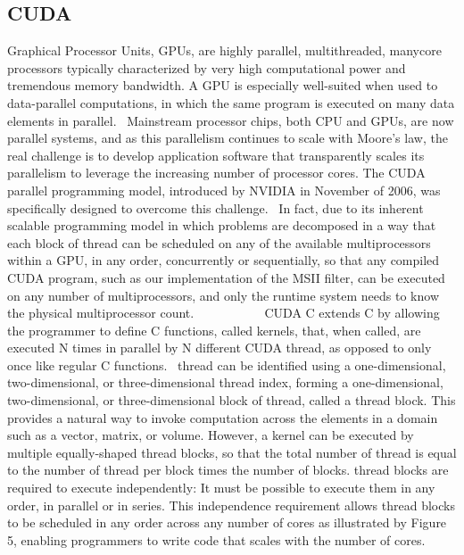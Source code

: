 \documentclass{article}
\begin{document}
\subsection{CUDA}
Graphical Processor Units, GPUs, are highly parallel, multithreaded, manycore processors typically characterized by very high computational power and tremendous memory bandwidth. A GPU is especially well-suited when used to data-parallel computations, in which the same program is executed on many data elements in parallel.~\cite[p.~1.1]{CUDA18}
Mainstream processor chips, both CPU and GPUs, are now parallel systems, and as this parallelism continues to scale with Moore's law, the real challenge is to develop application software that transparently scales its parallelism to leverage the increasing number of processor cores. The CUDA parallel programming model, introduced by NVIDIA in November of 2006, was specifically designed to overcome this challenge.~\cite[p.~1.3]{CUDA18}
In fact, due to its inherent scalable programming model in which problems are decomposed in a way that each block of thread can be scheduled on any of the available multiprocessors within a GPU, in any order, concurrently or sequentially, so that any compiled CUDA program, such as our implementation of the MSII filter, can be executed on any number of multiprocessors, and only the runtime system needs to know the physical multiprocessor count.~\cite[p.~1.3]{CUDA18}
~~~~~~~~~
CUDA C extends C by allowing the programmer to define C functions, called kernels, that, when called, are executed N times in parallel by N different CUDA thread, as opposed to only once like regular C functions.~\cite[p.~2.1]{CUDA18}
thread can be identified using a one-dimensional, two-dimensional, or three-dimensional thread index, forming a one-dimensional, two-dimensional, or three-dimensional block of thread, called a thread block. This provides a natural way to invoke computation across the elements in a domain such as a vector, matrix, or volume. However, a kernel can be executed by multiple equally-shaped thread blocks, so that the total number of thread is equal to the number of thread per block times the number of blocks. thread blocks are required to execute independently: It must be possible to execute them in any order, in parallel or in series. This independence requirement allows thread blocks to be scheduled in any order across any number of cores as illustrated by Figure 5, enabling programmers to write code that scales with the number of cores.~\cite[p.~2.2]{CUDA18}
\end{document}

